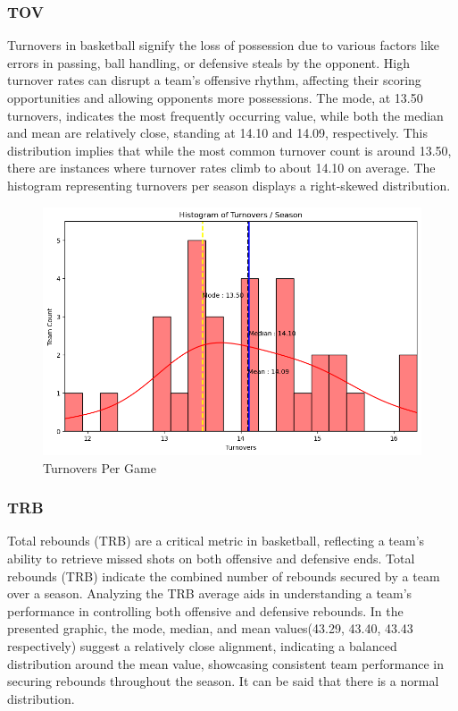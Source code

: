 \documentclass[conference]{IEEEtran}
\begin{document}
\subsubsection{TOV}
Turnovers in basketball signify the loss of possession due to various factors like errors in passing, ball handling, or defensive steals by the opponent. High turnover rates can disrupt a team's offensive rhythm, affecting their scoring opportunities and allowing opponents more possessions. The mode, at 13.50 turnovers, indicates the most frequently occurring value, while both the median and mean are relatively close, standing at 14.10 and 14.09, respectively. This distribution implies that while the most common turnover count is around 13.50, there are instances where turnover rates climb to about 14.10 on average.  The histogram representing turnovers per season displays a  right-skewed distribution.
\begin{figure}[h]
    \centering
    \includegraphics[scale=0.41]{TOV_image.png}
    \caption{Turnovers Per Game}
    \label{fig:enter-label}
\end{figure}

\subsubsection{TRB}
Total rebounds (TRB) are a critical metric in basketball, reflecting a team's ability to retrieve missed shots on both offensive and defensive ends. Total rebounds (TRB) indicate the combined number of rebounds secured by a team over a season. Analyzing the TRB average aids in understanding a team's performance in controlling both offensive and defensive rebounds. In the presented graphic, the mode, median, and mean values(43.29, 43.40, 43.43 respectively) suggest a relatively close alignment, indicating a balanced distribution around the mean value, showcasing consistent team performance in securing rebounds throughout the season. It can be said that there is a normal distribution.
\vspace{\baselineskip}
\vspace{\baselineskip}
\vspace{\baselineskip}
\vspace{\baselineskip}
\vspace{\baselineskip}
\vspace{\baselineskip}
\end{document}
